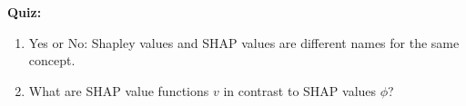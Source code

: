 \textbf{Quiz:}
\begin{enumerate}
    \item Yes or No: Shapley values and SHAP values are different names for the same concept.
    \item What are SHAP value functions $v$ in contrast to SHAP values $\phi$?
\end{enumerate}

